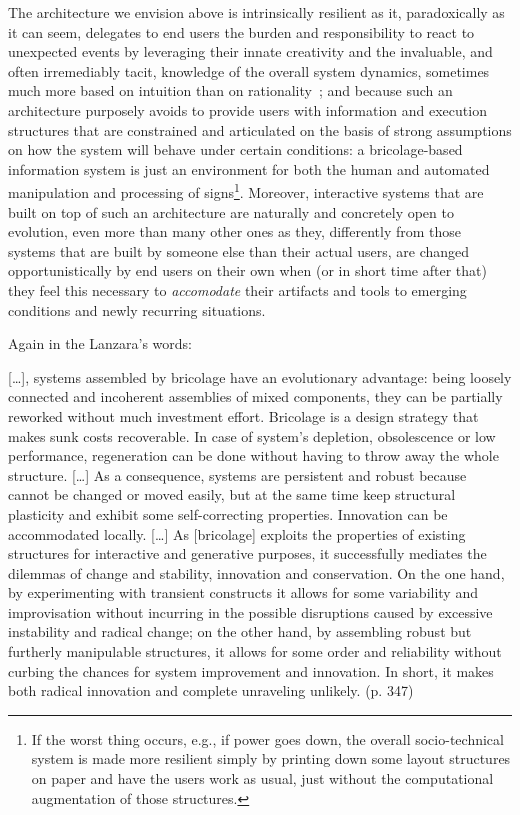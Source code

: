 \documentclass{article}
\let\origquotation\quotation
\let\endorigquotation\endquotation
\renewenvironment{quotation}{\vspace{-0.5\parskip}
  \origquotation
  \footnotesize
}{\endorigquotation}
\begin{document}
The architecture we envision above is intrinsically resilient as it, paradoxically as it can seem, delegates to end users the burden and responsibility to react to unexpected events by leveraging their innate creativity and the invaluable, and often irremediably tacit, knowledge of the overall system dynamics, sometimes much more based on intuition than on rationality~\citep{mark_resilience_2008}; and because such an architecture purposely avoids to provide users with information and execution structures that are constrained and articulated on the basis of strong assumptions on how the system will behave under certain conditions: a bricolage-based information system is just an environment for both the human and automated manipulation and processing of signs\footnote{If the worst thing occurs, e.g., if power goes down, the overall socio-technical system is made more resilient simply by printing down some layout structures on paper and have the users work as usual, just without the computational augmentation of those structures.}. Moreover, interactive systems that are built on top of such an architecture are naturally and concretely open to evolution, even more than many other ones as they, differently from those systems that are built by someone else than their actual users, are changed opportunistically by end users on their own when (or in short time after that) they feel this necessary to \emph{accomodate} their artifacts and tools to emerging conditions and newly recurring situations.

Again in the Lanzara's words:
\begin{quotation}
[\dots], systems assembled by bricolage have an evolutionary advantage: being loosely connected and incoherent assemblies of mixed components, they can be partially reworked without much investment effort. Bricolage is a design strategy that makes sunk costs recoverable. In case of system's depletion, obsolescence or low performance, regeneration can be done without having to throw away the whole structure. [\dots]
As a consequence, systems are persistent and robust because cannot be changed or moved easily, but at the same time keep structural plasticity and exhibit some self-correcting properties. Innovation can be accommodated locally. [\dots] As [bricolage] exploits the properties of existing structures for interactive and generative purposes, it successfully mediates the dilemmas of change and stability, innovation and conservation. On the one hand, by experimenting with transient constructs it allows for some variability and improvisation without incurring in the possible disruptions caused by excessive instability and radical change; on the other hand, by assembling robust but furtherly manipulable structures, it allows for some order and reliability without curbing the chances for system improvement and innovation. In short, it makes both radical innovation and complete unraveling unlikely. (p. 347)
\end{quotation}
\end{document}
